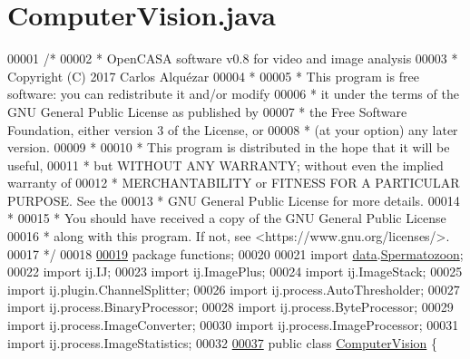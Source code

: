 \hypertarget{_computer_vision_8java_source}{}\section{Computer\+Vision.\+java}
\label{_computer_vision_8java_source}

\begin{DoxyCode}
00001 \textcolor{comment}{/*}
00002 \textcolor{comment}{ *   OpenCASA software v0.8 for video and image analysis}
00003 \textcolor{comment}{ *   Copyright (C) 2017  Carlos Alquézar}
00004 \textcolor{comment}{ *}
00005 \textcolor{comment}{ *   This program is free software: you can redistribute it and/or modify}
00006 \textcolor{comment}{ *   it under the terms of the GNU General Public License as published by}
00007 \textcolor{comment}{ *   the Free Software Foundation, either version 3 of the License, or}
00008 \textcolor{comment}{ *   (at your option) any later version.}
00009 \textcolor{comment}{ *}
00010 \textcolor{comment}{ *   This program is distributed in the hope that it will be useful,}
00011 \textcolor{comment}{ *   but WITHOUT ANY WARRANTY; without even the implied warranty of}
00012 \textcolor{comment}{ *   MERCHANTABILITY or FITNESS FOR A PARTICULAR PURPOSE.  See the}
00013 \textcolor{comment}{ *   GNU General Public License for more details.}
00014 \textcolor{comment}{ *}
00015 \textcolor{comment}{ *   You should have received a copy of the GNU General Public License}
00016 \textcolor{comment}{ *   along with this program.  If not, see <https://www.gnu.org/licenses/>.}
00017 \textcolor{comment}{*/}    
00018 
\hypertarget{_computer_vision_8java_source_l00019}{}\hyperlink{namespacefunctions}{00019} \textcolor{keyword}{package }functions;
00020 
00021 \textcolor{keyword}{import} \hyperlink{namespacedata}{data}.\hyperlink{classdata_1_1_spermatozoon}{Spermatozoon};
00022 \textcolor{keyword}{import} ij.IJ;
00023 \textcolor{keyword}{import} ij.ImagePlus;
00024 \textcolor{keyword}{import} ij.ImageStack;
00025 \textcolor{keyword}{import} ij.plugin.ChannelSplitter;
00026 \textcolor{keyword}{import} ij.process.AutoThresholder;
00027 \textcolor{keyword}{import} ij.process.BinaryProcessor;
00028 \textcolor{keyword}{import} ij.process.ByteProcessor;
00029 \textcolor{keyword}{import} ij.process.ImageConverter;
00030 \textcolor{keyword}{import} ij.process.ImageProcessor;
00031 \textcolor{keyword}{import} ij.process.ImageStatistics;
00032 
\hypertarget{_computer_vision_8java_source_l00037}{}\hyperlink{classfunctions_1_1_computer_vision}{00037} \textcolor{keyword}{public} \textcolor{keyword}{class }\hyperlink{classfunctions_1_1_computer_vision}{ComputerVision} \{

\end{DoxyCode}
